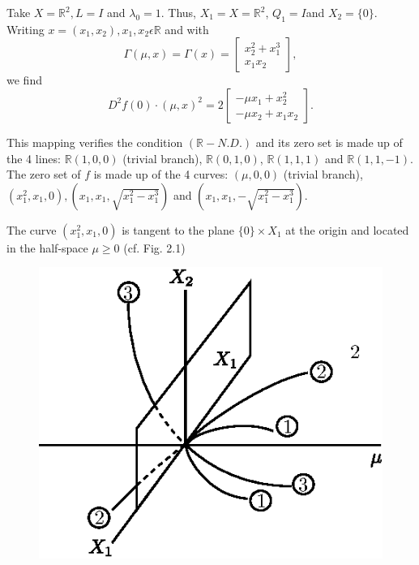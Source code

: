 \begin{example*}
Take $X = \mathbb{R}^{2}, L = I$ and  $\lambda_{0} = 1$. Thus, $X_{1}
= X = \mathbb{R}^{2}$, $Q_{1} = I$\pageoriginale and $X_{2} =
\{0\}$. Writing $x = (x_{1}, x_{2}), x_{1}, x_{2} \epsilon \mathbb{R}$
and with
\begin{equation*}
\Gamma(\mu, x) = \Gamma(x) = 
\begin{bmatrix}
x_{2}^{2} + x_{1}^{3}\\
x_{1}x_{2}
\end{bmatrix},
\end{equation*}
we find
\begin{equation*}
D^{2}f(0) \cdot (\mu, x)^{2} = 2
\begin{bmatrix}
 -\mu x_{1} + x_{2}^{2}\\
 -\mu x_{2} + x_{1}x_{2}
\end{bmatrix}.
\end{equation*}

This mapping verifies the condition $(\mathbb{R}-N.D.)$ and its zero
set is made up of the 4 lines: $\mathbb{R}(1, 0, 0)$ (trivial
branch), $\mathbb{R}(0, 1, 0)$, $\mathbb{R}(1, 1, 1)$ and
$\mathbb{R}(1, 1, -1)$. The zero set of $f$ is made up of the 4 curves:
$(\mu, 0, 0)$ (trivial branch), $(x_{1}^{2}, x_{1}, 0), (x_{1}, x_{1},
\sqrt{x_{1}^{2} - x_{1}^{3}})$ and $(x_{1}, x_{1}, - \sqrt{x_{1}^{2} -
x_{1}^{3}})$.

The curve $(x_{1}^{2}, x_{1}, 0)$ is tangent to the plane $\{0\}
\times X_{1}$ at the origin and located in the half-space $\mu \geq 0$
(cf. Fig. 2.1)
\begin{figure}[H]
\centering
\includegraphics{figure/fig76-2.1.eps}
\caption{}
\end{figure}
\end{example*}

